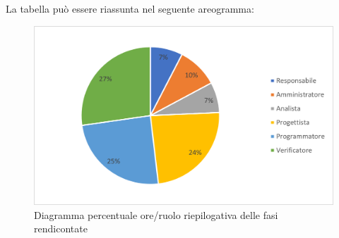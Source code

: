 La tabella può essere riassunta nel seguente areogramma:
\begin{figure}[H]
	\centering
	\includegraphics[width=0.8\linewidth]{res/images/preventivo/totrend2.png}
	\caption{Diagramma percentuale ore/ruolo riepilogativa delle fasi rendicontate}
	\label{fig:diagramma costi ruolo riepilogativa delle fasi rendicontate}
\end{figure}

